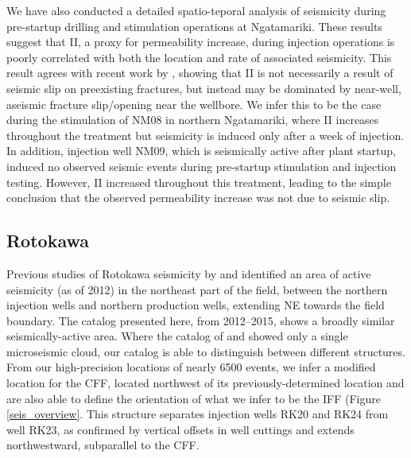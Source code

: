 We have also conducted a detailed spatio-teporal analysis of seismicity during pre-startup drilling and \gls{stimulation} operations at Ngatamariki. These results suggest that \acrfull{II}, a proxy for \gls{permeability} increase, during injection operations is poorly correlated with both the location and rate of associated seismicity. This result agrees with recent work by \citet{Riffault_2018}, showing that \acrshort{II} is not necessarily a result of seismic slip on preexisting fractures, but instead may be dominated by near-well, aseismic fracture slip\slash{opening} near the wellbore. We infer this to be the case during the \gls{stimulation} of NM08 in northern Ngatamariki, where \acrshort{II} increases throughout the treatment but seismicity is induced only after a week of injection. In addition, injection well NM09, which is seismically active after plant startup, induced no observed seismic events during pre-startup \gls{stimulation} and injection testing. However, \acrshort{II} increased throughout this treatment, leading to the simple conclusion that the observed \gls{permeability} increase was not due to seismic slip.

\subsection{Rotokawa}
Previous studies of Rotokawa seismicity by \citet{Sherburn_2015} and \citet{Sewell_2015WGC} identified an area of active seismicity (as of 2012) in the northeast part of the field, between the northern injection wells and northern production wells, extending NE towards the field boundary. The catalog presented here, from 2012--2015, shows a broadly similar seismically-active area. Where the catalog of \citet{Sherburn_2015} and \citet{Sewell_2015WGC} showed only a single microseismic cloud, our catalog is able to distinguish between different structures. From our high-precision locations of nearly 6500 events, we infer a modified location for the \acrfull{CFF}, located northwest of its previously-determined location and are also able to define the orientation of what we infer to be the \acrfull{IFF} (Figure \ref{seis_overview}. This structure separates injection wells RK20 and RK24 from well RK23, as confirmed by vertical offsets in well cuttings and extends northwestward, subparallel to the \acrshort{CFF}.

